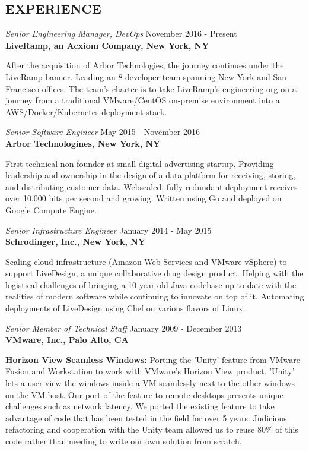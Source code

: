 \documentclass[overlapped,line,margin]{res}
\begin{document}
\begin{resume}
\section{EXPERIENCE}
{\sl Senior Engineering Manager, DevOps} \hfill November 2016 - Present \\
\textbf{LiveRamp, an Acxiom Company, New York, NY}

  After the acquisition of Arbor Technologies, the journey continues under
  the LiveRamp banner. Leading an 8-developer team spanning New York
  and San Francisco offices. The team's charter is to take LiveRamp's
  engineering org on a journey from a traditional VMware/CentOS
  on-premise environment into a AWS/Docker/Kubernetes deployment stack.

{\sl Senior Software Engineer} \hfill May 2015 - November 2016 \\
\textbf{Arbor Technologines, New York, NY}

  First technical non-founder at small digital advertising startup. Providing
  leadership and ownership in the design of a data platform for receiving,
  storing, and distributing customer data. Webscaled, fully redundant
  deployment receives over 10,000 hits per second and growing. Written using Go
  and deployed on Google Compute Engine.

{\sl Senior Infrastructure Engineer} \hfill January 2014 - May 2015 \\
\textbf{Schrodinger, Inc., New York, NY}

  Scaling cloud infrastructure (Amazon Web Services and VMware vSphere) to
  support LiveDesign, a unique collaborative drug design product. Helping with
  the logistical challenges of bringing a 10 year old Java codebase up to date
  with the realities of modern software while continuing to innovate on top of
  it. Automating deployments of LiveDesign using Chef on various flavors of
  Linux.

{\sl Senior Member of Technical Staff} \hfill January 2009 - December 2013 \\
\textbf{VMware, Inc., Palo Alto, CA}

  \textbf{Horizon View Seamless Windows:} Porting the 'Unity' feature
  from VMware Fusion and Workstation to work with VMware's Horizon View product.
  'Unity' lets a user view the windows inside a VM seamlessly next to the other
  windows on the VM host. Our port of the feature to remote desktops presents
  unique challenges such as network latency. We ported the existing feature to
  take advantage of code that has been tested in the field for over 5 years.
  Judicious refactoring and cooperation with the Unity team allowed us to reuse
  80\% of this code rather than needing to write our own solution from scratch.


\end{resume}
\end{document}

